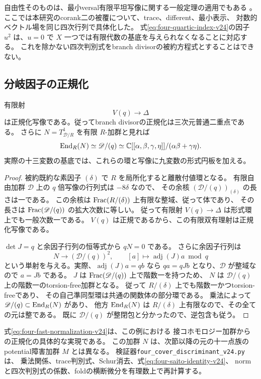 自由性そのものは、最小versal有限平坦写像に関する一般定理の適用でもある
\cite[Theorems 3.1, 3.4]{BEvB}。
ここでは本研究のcorank二の被覆について、trace、different、最小表示、
対数的ベクトル場を同じ四次行列で具体化した。
式\eqref{eq:four-quartic-index-v24}の因子 $u^2$ は、$u=0$ で
$X$ 一つでは有限代数の基底を与えられなくなることに対応する。
これを除かない四次判別式をbranch divisorの被約方程式とすることはできない。

\subsection{分岐因子の正規化}

\begin{theorem}\label{thm:four-branch-normalization-v24}
有限射
\[
 V(q)\longrightarrow\Delta
\]
は正規化写像である。従ってbranch divisorの正規化は三次元普通二重点である。
さらに $N=T^1_{\mathscr D/R}$ を有限 $R$-加群と見れば
\begin{equation}\label{eq:four-fast-normalization-v24}
 \operatorname{End}_R(N)\simeq\mathscr D/(q)
 \simeq\mathbb C[[\alpha,\beta,\gamma,\eta]]/(\alpha\beta+\gamma\eta).
\end{equation}
実際の十三変数の基底では、これらの環と写像に九変数の形式円板を加える。
\end{theorem}

\begin{proof}
被約既約な素因子 $(\delta)$ で $R$ を局所化すると離散付値環となる。
有限自由加群 $\mathscr D$ 上の $q$ 倍写像の行列式は $-8\delta$ なので、
その余核 $(\mathscr D/(q))_{(\delta)}$ の長さは一である。
この余核は $\operatorname{Frac}(R/(\delta))$ 上有限な整域、従って体であり、
その長さは $\operatorname{Frac}(\mathscr D/(q))$ の拡大次数に等しい。
従って有限射 $V(q)\to\Delta$ は形式環上でも一般次数一である。
$V(q)$ は正規であるから、この有限双有理射は正規化写像である。

$\det J=q$ と余因子行列の恒等式から $qN=0$ である。
さらに余因子行列は
\[
 N\longrightarrow(\mathscr D/(q))^2,\qquad
 [a]\longmapsto\operatorname{adj}(J)a\bmod q
\]
という単射を与える。実際、$\operatorname{adj}(J)a=qb$ なら
$q a=qJb$ となり、$\mathscr D$ が整域なので $a=Jb$ である。
$J$ は $\operatorname{Frac}(\mathscr D/(q))$ 上で階数一を持つため、
$N$ は $\mathscr D/(q)$ 上の階数一のtorsion-free加群となる。
従って $R/(\delta)$ 上でも階数一かつtorsion-freeであり、
その自己準同型環は共通の関数体の部分環である。
乗法によって $\mathscr D/(q)\subset\operatorname{End}_R(N)$ があり、
他方 $\operatorname{End}_R(N)$ は $R/(\delta)$ 上有限なので、その全ての元は整である。
既に $\mathscr D/(q)$ が整閉包と分かったので、逆包含も従う。
\end{proof}

式\eqref{eq:four-fast-normalization-v24}は、この例における
接コホモロジー加群からの正規化の具体的な実現である。
この加群 $N$ は、次節以降の元の十一点族のpotential障害加群 $M$ とは異なる。
検証器\nolinkurl{four_cover_discriminant_v24.py}は、
乗法関係、trace判別式、Schur消去、式\eqref{eq:four-saito-identity-v24}、
normと四次判別式の係数、foldの横断微分を有理数上で再計算する。
